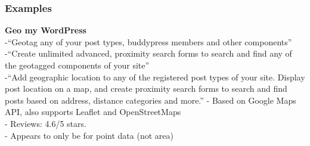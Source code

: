 


\subsubsection{Examples}
\textbf{Geo my WordPress}\\
-{\color{orange}“Geotag any of your post types, buddypress members and other components”\cite{Fitoussi}}\\
-{\color{orange}“Create unlimited advanced, proximity search forms to search and find any of the geotagged components of your site”\cite{Fitoussi}}\\
-{\color{orange}“Add geographic location to any of the registered post types of your site. Display post location on a map, and create proximity search forms to search and find posts based on address, distance categories and more.”\cite{Fitoussi}}
-{\color{orange} Based on Google Maps API, also supports Leaflet and OpenStreetMaps\cite{Fitoussi}}\\
-{\color{orange} Reviews: 4.6/5 stars.\cite{Fitoussi}}\\
-{\color{purple} Appears to only be for point data (not area)\cite{Fitoussi}}\\

